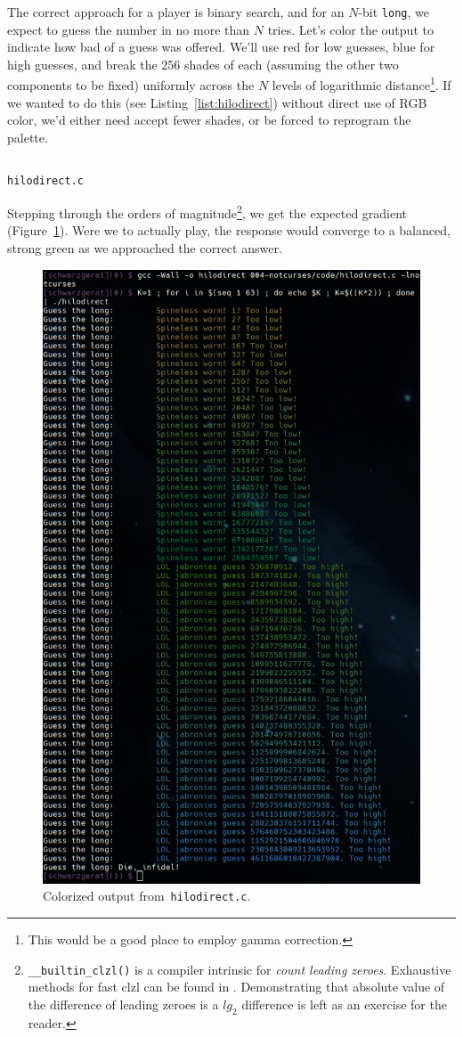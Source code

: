 \documentclass[letterpaper,10pt]{article}
\begin{document}
The correct approach for a player is binary search, and for an $N$-bit
\texttt{long}, we expect to guess the number in no more than $N$ tries. Let's
color the output to indicate how bad of a guess was offered. We'll use red for
low guesses, blue for high guesses, and break the 256 shades of each (assuming
the other two components to be fixed) uniformly across the $N$ levels of
logarithmic distance\footnote{This would be a good place to employ \gls{gamma correction}.}.
If we wanted to do this (see Listing~\ref{list:hilodirect}) without direct use of RGB color,
we'd either need accept fewer shades, or be forced to reprogram the palette.

\begin{listing}[!htbp]
\inputminted[]{C}{code/hilodirect.c}
\caption{\texttt{hilodirect.c}}
\label{list:hilodirect}
\end{listing}

Stepping through the orders of magnitude\footnote{\texttt{\_\_builtin\_clzl()}
is a compiler intrinsic for \textit{count leading zeroes}. Exhaustive methods
for fast clzl can be found in \cite{hackerdelight}. Demonstrating that
absolute value of the difference of leading zeroes is a $lg_{2}$ difference
is left as an exercise for the reader.}, we get the expected gradient
(Figure~\ref{fig:colorguess}). Were we to actually play, the response would
converge to a balanced, strong green as we approached the correct answer.

\begin{figure}[!htbp]
\centering \includegraphics[width=.75\linewidth]{media/hilodirect.png}
\caption{Colorized output from~\texttt{hilodirect.c}.}
\label{fig:colorguess}
\end{figure}
\end{document}
